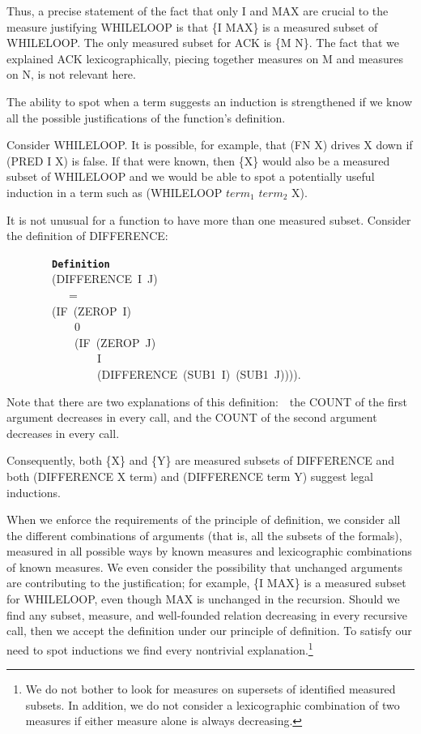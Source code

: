 \documentclass[11pt]{book}
\newenvironment{pubasis}{\begin{flushleft}\ttfamily\small}{\normalsize\rmfamily\end{flushleft}}
\newcommand{\axiomordefinition}[1]{\vspace{6pt}\texttt{\textbf{#1}}}
\begin{document}
Thus, a precise statement of the fact that only I and MAX
are crucial to the measure justifying WHILELOOP is that \{I MAX\}
is a measured subset of WHILELOOP.
The only measured subset for ACK is \{M N\}.  The
fact that we explained ACK lexicographically, piecing
together measures on M and measures on N, is not relevant
here. 

The ability to spot when a term suggests an induction
is strengthened if we know all the possible justifications of
the function's definition.

Consider WHILELOOP.  It is possible, for example, that (FN X) drives X down if (PRED I X) is false.
If that were known, then \{X\} would also be a measured subset of WHILELOOP
and we would be able to spot a potentially useful
induction in a term such as (WHILELOOP $term_{1}$ $term_{2}$ X).

It is not unusual for a function to have more than one measured
subset.  Consider the definition of DIFFERENCE:
\begin{pubasis}
~~~~~~~~\axiomordefinition{Definition}\\
~~~~~~~~(DIFFERENCE~I~J)\\
~~~~~~~~~~~=\\
~~~~~~~~(IF~(ZEROP~I)\\
~~~~~~~~~~~~0\\
~~~~~~~~~~~~(IF~(ZEROP~J)\\
~~~~~~~~~~~~~~~~I\\
~~~~~~~~~~~~~~~~(DIFFERENCE~(SUB1~I)~(SUB1~J)))).\\
\end{pubasis}
Note that there
are two explanations of this definition:~~the COUNT of the first argument
decreases in every call, and the COUNT of the second argument decreases in every call.

Consequently, both \{X\} and \{Y\} are measured subsets of DIFFERENCE
and  both (DIFFERENCE X term) and (DIFFERENCE term Y) suggest
legal inductions.  

When we enforce the requirements of the principle of definition, we consider all the
different combinations of arguments (that is, all the subsets of
the formals), measured in all possible ways by known measures and
lexicographic combinations of known measures.
We even consider the possibility that unchanged arguments
are contributing to the justification; for example, \{I MAX\} is a measured subset for WHILELOOP,
even though MAX is unchanged in the recursion.  Should we find
any subset, measure, and well-founded relation decreasing in every
recursive call, then we accept the definition under our principle
of definition.
To satisfy our need to spot inductions we find every nontrivial
explanation.\footnote{We do not bother to look for measures on supersets of identified measured subsets.  In addition, we do not consider a lexicographic combination of two measures if either measure alone is always decreasing.}
\end{document}
